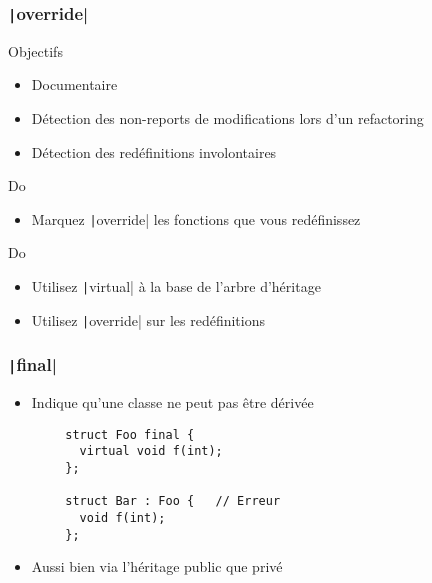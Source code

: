 \documentclass[C++.tex]{subfiles}
\begin{document}
\begin{frame}[fragile]
	\frametitle{\texttt|override|}
	\begin{block}{Objectifs}
		\begin{itemize}
			\item Documentaire
			\item Détection des non-reports de modifications lors d'un refactoring
			\item Détection des redéfinitions involontaires
		\end{itemize}
	\end{block}

	\begin{exampleblock}{Do}
		\begin{itemize}
			\item Marquez \texttt|override| les fonctions que vous redéfinissez
		\end{itemize}
	\end{exampleblock}

	\begin{exampleblock}{Do}
		\begin{itemize}
			\item Utilisez \texttt|virtual| à la base de l'arbre d'héritage
			\item Utilisez \texttt|override| sur les redéfinitions
		\end{itemize}

	\end{exampleblock}
\end{frame}

\begin{frame}[fragile]
	\frametitle{\texttt|final|}
	\begin{itemize}
		\item Indique qu'une classe ne peut pas être dérivée
	\end{itemize}

	\begin{verbatim}
		struct Foo final {
		  virtual void f(int);
		};

		struct Bar : Foo {   // Erreur
		  void f(int);
		};
	\end{verbatim}

	\begin{itemize}
		\item Aussi bien via l'héritage public que privé
	\end{itemize}
\end{frame}
\end{document}
